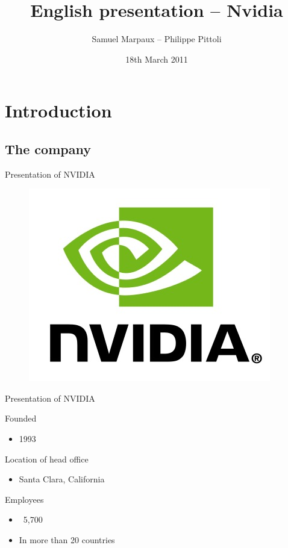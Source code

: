 \documentclass{beamer}
\date{18th March 2011}
\author{Samuel Marpaux -- Philippe Pittoli}
\title[Nvidia]{English presentation -- Nvidia}
\begin{document}

\section{Introduction}
\subsection{The company}

\begin{frame}{Presentation of NVIDIA}
	\transdissolve[duration=0.08]
	\begin{figure}[h]
		\includegraphics[width=0.90\textheight]{images/Nvidia_logo.jpg}
	\end{figure}
\end{frame}

\begin{frame}{Presentation of NVIDIA}
	\transdissolve[duration=0.03]

	\begin{block}{Founded}
		\begin{itemize}
			\item<+->{1993}
		\end{itemize}
	\end{block}	
	\pause
	\begin{block}{Location of head office}
		\begin{itemize}
			\item<+->{Santa Clara, California}
		\end{itemize}
	\end{block}
	\pause
	\begin{block}{Employees}
		\begin{itemize}
			\item<+->{~5,700}
			\item<+->{In more than 20 countries}
		\end{itemize}
	\end{block}
\end{frame}
\end{document}
